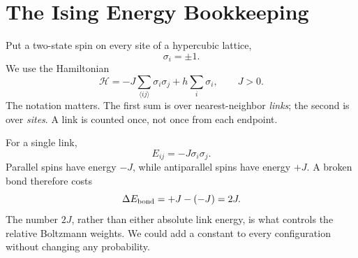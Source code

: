 \section{The Ising Energy Bookkeeping}

Put a two-state spin on every site of a hypercubic lattice,
\begin{equation}
\sigma_i=\pm1.
\end{equation}
We use the Hamiltonian
\begin{equation}
\mathcal H
=-J\sum_{\langle ij\rangle}\sigma_i\sigma_j
+h\sum_i\sigma_i,
\qquad J>0.
\label{eq:ising-hamiltonian}
\end{equation}
The notation matters. The first sum is over nearest-neighbor \emph{links}; the second is over \emph{sites}. A link is counted once, not once from each endpoint.

For a single link,
\begin{equation}
E_{ij}=-J\sigma_i\sigma_j.
\end{equation}
Parallel spins have energy \(-J\), while antiparallel spins have energy \(+J\). A broken bond therefore costs
\begin{equation}
\Delta E_{\rm bond}=+J-(-J)=2J.
\label{eq:broken-bond}
\end{equation}
The number \(2J\), rather than either absolute link energy, is what controls the relative Boltzmann weights. We could add a constant to every configuration without changing any probability.

\begin{classroomqa}
\end{classroomqa}

\begin{classroomqa}
\end{classroomqa}

